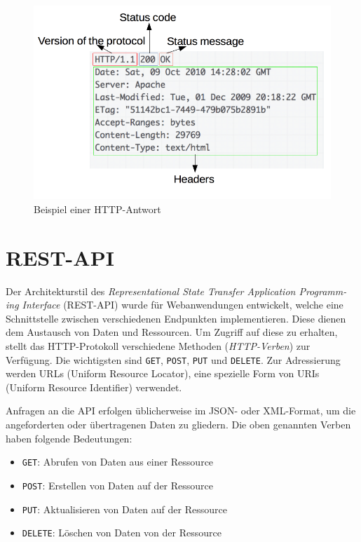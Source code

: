 \begin{figure}[ht]
	\centering
	\includegraphics[width=.8\linewidth]{http_response.png}
	\caption{Beispiel einer HTTP-Antwort}
	\label{http-response}
\end{figure}

\section{REST-API}
Der Architekturstil des \emph{Representational State Transfer Application Programm-ing Interface} (REST-API) wurde für Webanwendungen entwickelt, welche eine Schnittstelle zwischen verschiedenen Endpunkten implementieren. 
Diese dienen dem Austausch von Daten und Ressourcen. 
Um Zugriff auf diese zu erhalten, stellt das HTTP-Protokoll verschiedene Methoden (\emph{HTTP-Verben}) zur Verfügung. Die wichtigsten sind \texttt{GET}, \texttt{POST}, \texttt{PUT} und \texttt{DELETE}. 
Zur Adressierung werden URLs (Uniform  Resource Locator), eine spezielle Form von URIs (Uniform Resource Identifier) verwendet.

Anfragen an die API erfolgen üblicherweise im JSON- oder XML-Format, um die angeforderten oder übertragenen Daten zu gliedern. 
Die oben genannten Verben haben folgende Bedeutungen:
\begin{itemize}
	\item \texttt{GET}: Abrufen von Daten aus einer Ressource
	\item \texttt{POST}: Erstellen von Daten auf der Ressource
	\item \texttt{PUT}: Aktualisieren von Daten auf der Ressource
	\item \texttt{DELETE}: Löschen von Daten von der Ressource
\end{itemize}

